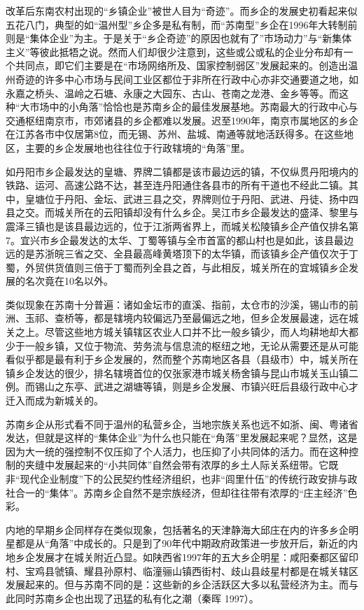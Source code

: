 \documentclass[a4paper,12pt,punct=kaiming,fontset=none]{ctexart}
\begin{document}
改革后东南农村出现的“乡镇企业”被世人目为“奇迹”。而乡企的发展史初看起来似五花八门，典型的如“温州型”乡企多是私有制，而“苏南型”乡企在1996年大转制前则是“集体企业”为主。于是关于“乡企奇迹”的原因也就有了”市场动力”与“新集体主义”等彼此抵牾之说。然而人们却很少注意到，这些或公或私的企业分布却有一个共同点，即它们主要是在“市场网络所及、国家控制弱区”发展起来的。创造出温州奇迹的许多中心市场与民间工业区都位于非所在行政中心亦非交通要道之地，如永嘉之桥头、温岭之石塘、永康之大园东、古山、苍南之龙港、金乡等等。而这种“大市场中的小角落”恰恰也是苏南乡企的最佳发展基地。苏南最大的行政中心与交通枢纽南京市，市郊诸县的乡企都难以发展。迟至1990年，南京市属地区的乡企在江苏各市中仅居第8位，而无锡、苏州、盐城、南通等就地活跃得多。在这些地区，主要的乡企发展地也往往位于行政辖境的“角落”里。

如丹阳市乡企最发达的皇塘、界牌二镇都是该市最边远的镇，不仅纵贯丹阳境内的铁路、运河、高速公路不达，甚至连丹阳通住各县市的所有干道也不经此二镇。其中，皇塘位于丹阳、金坛、武进三县之交，界牌则位于丹阳、武进、丹徒、扬中四县之交。而城关所在的云阳镇却没有什么乡企。吴江市乡企最发达的盛泽、黎里与震泽三镇也是该县最边远的，位于江浙两省界上，而城关松陵镇乡企产值仅排名第7。宜兴市乡企最发达的太华、丁蜀等镇与全市首富的都山村也是如此，该县最边远的是苏浙皖三省之交、全县最高峰黄塔顶下的太华镇，而该镇乡企产值仅次于丁蜀，外贸供货值则三倍于丁蜀而列全县之首，与此相反，城关所在的宜城镇乡企发展的名次竟在10名以外。

类似现象在苏南十分普遍：诸如金坛市的直溪、指前，太仓市的沙溪，锡山市的前洲、玉祁、查桥等，都是辖境内较偏远乃至最偏远之地，但乡企发展最速，远在城关之上。尽管这些地方城关镇辖区农业人口并不比一般乡镇少，而人均耕地却大都少于一般乡镇，又位于物流、劳务流与信息流的枢纽之地，无论从需要还是从可能看似乎都是最有利于乡企发展的，然而整个苏南地区各县（县级市）中，城关所在镇乡企发达的很少，排名辖境首位的仅张家港市城关杨舍镇与昆山市城关玉山镇二例。而锡山之东亭、武进之湖塘等镇，则是乡企发展、市镇兴旺后县级行政中心才迁入而成为新城关的。

苏南乡企从形式看不同于温州的私营乡企，当地宗族关系也远不如浙、闽、粤诸省发达，但就是这样的“集体企业”为什么也只能在“角落”里发展起来呢？显然，这是因为大一统的强控制不仅压抑了个人活力，也压抑了小共同体的活力。而在这种控制的夹缝中发展起来的“小共同体”自然会带有浓厚的乡土人际关系纽带。它既非“现代企业制度”下的公民契约性经济组织，也非“闾里什伍”的传统行政安排与政社合一的“集体”。苏南乡企自然不是宗族经济，但却往往带有浓厚的“庄主经济”色彩。

内地的早期乡企同样存在类似现象，包括著名的天津静海大邱庄在内的许多乡企明星都是从“角落”中成长的。只是到了90年代中期政府政策进一步放开后，新近的内地乡企发展才在城关附近凸显。如陕西省1997年的五大乡企明星：咸阳秦都区留印村、宝鸡县虢镇、耀县孙原村、临潼骊山镇西街村、歧山县歧星村都是在城关辖区发展起来的。但与苏南不同的是：这些新的乡企活跃区大多以私营经济为主。而与此同时苏南乡企也出现了迅猛的私有化之潮（秦晖 1997）。
\end{document}
